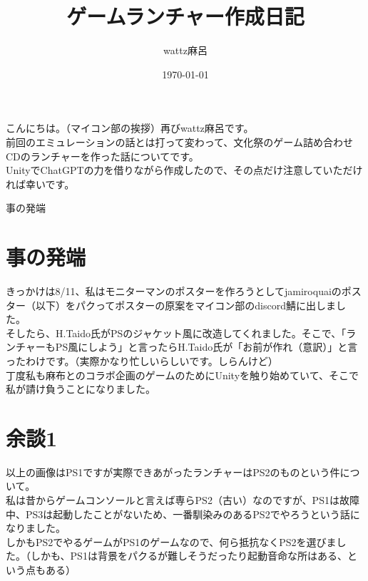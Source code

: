 \documentclass[b5paper,11pt]{jsarticle}
\begin{document}
\title{ゲームランチャー作成日記}
\author{wattz麻呂}
\date{\today}
\maketitle
\thispagestyle{empty}

\begin{multicols*}{3}
  
こんにちは。（マイコン部の挨拶）再びwattz麻呂です。\\
前回のエミュレーションの話とは打って変わって、文化祭のゲーム詰め合わせCDのランチャーを作った話についてです。\\
UnityでChatGPTの力を借りながら作成したので、その点だけ注意していただければ幸いです。\\
\begin{index}{1}
事の発端
\end{index}
\section{事の発端}
きっかけは8/11、私はモニターマンのポスターを作ろうとしてjamiroquaiのポスター（以下）をパクってポスターの原案をマイコン部のdiscord鯖に出しました。\\
そしたら、H.Taido氏がPSのジャケット風に改造してくれました。そこで、「ランチャーもPS風にしよう」と言ったらH.Taido氏が「お前が作れ（意訳）」と言ったわけです。（実際かなり忙しいらしいです。しらんけど）\\
丁度私も麻布とのコラボ企画のゲームのためにUnityを触り始めていて、そこで私が請け負うことになりました。\\
\section{余談1}
以上の画像はPS1ですが実際できあがったランチャーはPS2のものという件について。\\
私は昔からゲームコンソールと言えば専らPS2（古い）なのですが、PS1は故障中、PS3は起動したことがないため、一番馴染みのあるPS2でやろうという話になりました。\\
しかもPS2でやるゲームがPS1のゲームなので、何ら抵抗なくPS2を選びました。（しかも、PS1は背景をパクるが難しそうだったり起動音命な所はある、という点もある）\\

\end{multicols*}
\end{document}
